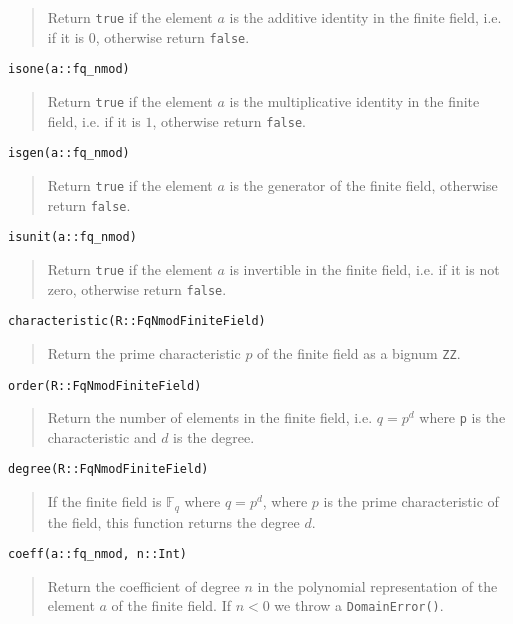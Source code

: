 \documentclass[a4paper,10pt]{article}
\newcommand{\F}{\mathbb{F}}
\newcommand{\code}{\lstinline}
\newcommand{\desc}[1]{\vspace{-3mm}\begin{quote}#1\end{quote}}
\begin{document}
{{\desc{Return \code{true} if the element $a$ is the additive identity in the
finite field, i.e. if it is $0$, otherwise return \code{false}.}

\begin{lstlisting}
isone(a::fq_nmod)
\end{lstlisting}

\desc{Return \code{true} if the element $a$ is the multiplicative identity in
the finite field, i.e. if it is $1$, otherwise return \code{false}.}

\begin{lstlisting}
isgen(a::fq_nmod)
\end{lstlisting}

\desc{Return \code{true} if the element $a$ is the generator of the finite field,
otherwise return \code{false}.}

\begin{lstlisting}
isunit(a::fq_nmod)
\end{lstlisting}

\desc{Return \code{true} if the element $a$ is invertible in the finite field,
i.e. if it is not zero, otherwise return \code{false}.}

\begin{lstlisting}
characteristic(R::FqNmodFiniteField)
\end{lstlisting}

\desc{Return the prime characteristic $p$ of the finite field as a bignum
\code{ZZ}.}

\begin{lstlisting}
order(R::FqNmodFiniteField)
\end{lstlisting}

\desc{Return the number of elements in the finite field, i.e. $q = p^d$
where \code{p} is the characteristic and $d$ is the degree.}

\begin{lstlisting}
degree(R::FqNmodFiniteField)
\end{lstlisting}

\desc{If the finite field is $\F_q$ where $q = p^d$, where $p$ is the
prime characteristic of the field, this function returns the degree
$d$.}

\begin{lstlisting}
coeff(a::fq_nmod, n::Int)
\end{lstlisting}

\desc{Return the coefficient of degree $n$ in the polynomial representation
of the element $a$ of the finite field. If $n < 0$ we throw a
\code{DomainError()}.}

}}
\end{document}
